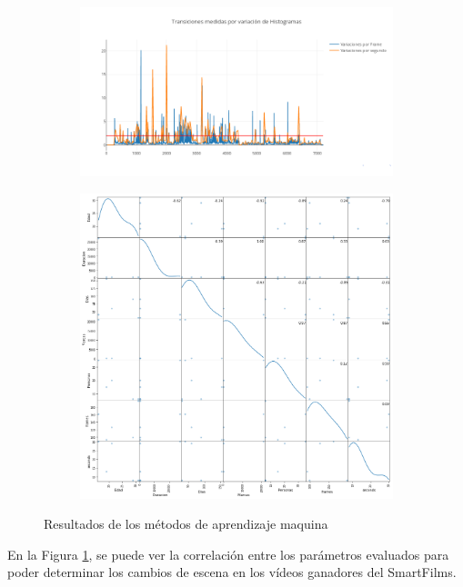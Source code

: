\documentclass[5p,times]{elsarticle}
\begin{document}
\begin{figure}[H]
\centering
\begin{subfigure}[t]{0.5\textwidth}
\includegraphics[width=\textwidth]{22}
\caption{}
\end{subfigure}
\hfill
\begin{subfigure}[t]{0.5\textwidth}
\includegraphics[width=\textwidth]{23}
\caption{}
\end{subfigure}
\caption{Resultados de los métodos de aprendizaje maquina}\label{fig:OpenCV}
\end{figure}

En la Figura \ref{fig:OpenCV}, se puede ver la correlación entre los parámetros evaluados para poder determinar los cambios de escena en los vídeos ganadores del SmartFilms.
\end{document}
